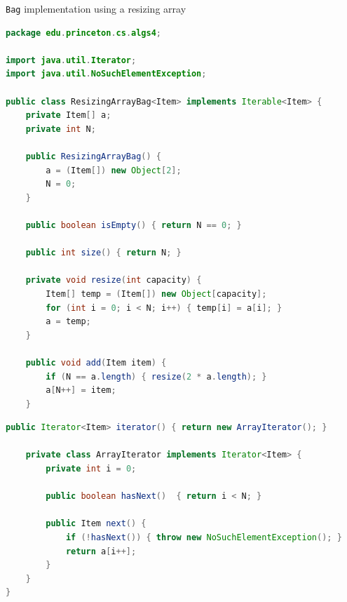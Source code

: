 \documentclass[8pt,a4paper,compress]{beamer}
\begin{document}
\begin{frame}[fragile]
\pause

\lstinline{Bag} implementation using a resizing array
\begin{lstlisting}[language=Java]
package edu.princeton.cs.algs4;

import java.util.Iterator;
import java.util.NoSuchElementException;

public class ResizingArrayBag<Item> implements Iterable<Item> {
    private Item[] a; 
    private int N;  

    public ResizingArrayBag() {
        a = (Item[]) new Object[2];
        N = 0;
    }

    public boolean isEmpty() { return N == 0; }

    public int size() { return N; }

    private void resize(int capacity) {
        Item[] temp = (Item[]) new Object[capacity];
        for (int i = 0; i < N; i++) { temp[i] = a[i]; }
        a = temp;
    }

    public void add(Item item) {
        if (N == a.length) { resize(2 * a.length); }
        a[N++] = item; 
    }
\end{lstlisting}
\end{frame}

\begin{frame}[fragile]
\pause

\begin{lstlisting}[language=Java]
    public Iterator<Item> iterator() { return new ArrayIterator(); }

    private class ArrayIterator implements Iterator<Item> {
        private int i = 0;

        public boolean hasNext()  { return i < N; }
        
        public Item next() {
            if (!hasNext()) { throw new NoSuchElementException(); }
            return a[i++];
        }
    }
}
\end{lstlisting}
\end{frame}
\end{document}
